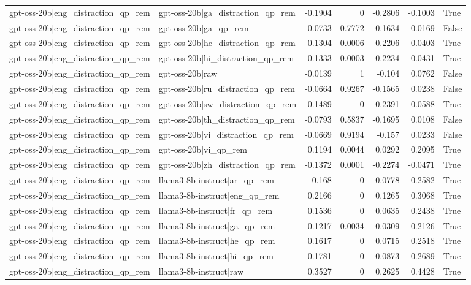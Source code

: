 \begin{table}
\begin{tabular}{l l r r r r l}
gpt-oss-20b|eng_distraction_qp_rem & gpt-oss-20b|ga_distraction_qp_rem & -0.1904 & 0 & -0.2806 & -0.1003 & True \\
gpt-oss-20b|eng_distraction_qp_rem & gpt-oss-20b|ga_qp_rem & -0.0733 & 0.7772 & -0.1634 & 0.0169 & False \\
gpt-oss-20b|eng_distraction_qp_rem & gpt-oss-20b|he_distraction_qp_rem & -0.1304 & 0.0006 & -0.2206 & -0.0403 & True \\
gpt-oss-20b|eng_distraction_qp_rem & gpt-oss-20b|hi_distraction_qp_rem & -0.1333 & 0.0003 & -0.2234 & -0.0431 & True \\
gpt-oss-20b|eng_distraction_qp_rem & gpt-oss-20b|raw & -0.0139 & 1 & -0.104 & 0.0762 & False \\
gpt-oss-20b|eng_distraction_qp_rem & gpt-oss-20b|ru_distraction_qp_rem & -0.0664 & 0.9267 & -0.1565 & 0.0238 & False \\
gpt-oss-20b|eng_distraction_qp_rem & gpt-oss-20b|sw_distraction_qp_rem & -0.1489 & 0 & -0.2391 & -0.0588 & True \\
gpt-oss-20b|eng_distraction_qp_rem & gpt-oss-20b|th_distraction_qp_rem & -0.0793 & 0.5837 & -0.1695 & 0.0108 & False \\
gpt-oss-20b|eng_distraction_qp_rem & gpt-oss-20b|vi_distraction_qp_rem & -0.0669 & 0.9194 & -0.157 & 0.0233 & False \\
gpt-oss-20b|eng_distraction_qp_rem & gpt-oss-20b|vi_qp_rem & 0.1194 & 0.0044 & 0.0292 & 0.2095 & True \\
gpt-oss-20b|eng_distraction_qp_rem & gpt-oss-20b|zh_distraction_qp_rem & -0.1372 & 0.0001 & -0.2274 & -0.0471 & True \\
gpt-oss-20b|eng_distraction_qp_rem & llama3-8b-instruct|ar_qp_rem & 0.168 & 0 & 0.0778 & 0.2582 & True \\
gpt-oss-20b|eng_distraction_qp_rem & llama3-8b-instruct|eng_qp_rem & 0.2166 & 0 & 0.1265 & 0.3068 & True \\
gpt-oss-20b|eng_distraction_qp_rem & llama3-8b-instruct|fr_qp_rem & 0.1536 & 0 & 0.0635 & 0.2438 & True \\
gpt-oss-20b|eng_distraction_qp_rem & llama3-8b-instruct|ga_qp_rem & 0.1217 & 0.0034 & 0.0309 & 0.2126 & True \\
gpt-oss-20b|eng_distraction_qp_rem & llama3-8b-instruct|he_qp_rem & 0.1617 & 0 & 0.0715 & 0.2518 & True \\
gpt-oss-20b|eng_distraction_qp_rem & llama3-8b-instruct|hi_qp_rem & 0.1781 & 0 & 0.0873 & 0.2689 & True \\
gpt-oss-20b|eng_distraction_qp_rem & llama3-8b-instruct|raw & 0.3527 & 0 & 0.2625 & 0.4428 & True \\

\end{tabular}
\end{table}
